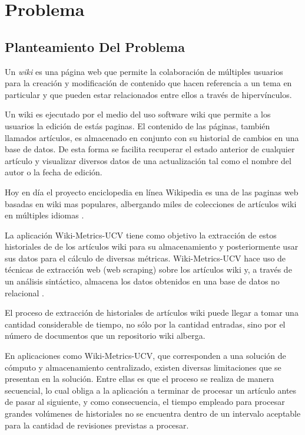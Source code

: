 \section{Problema}

\subsection{Planteamiento Del Problema}

Un \emph{wiki} es una página web que permite la colaboración de múltiples usuarios para 
la creación y modificación de contenido que hacen referencia a un tema en particular y
que pueden estar relacionados entre ellos a través de hipervínculos.

Un wiki es ejecutado por el medio del uso software wiki que permite a los usuarios la edición
de estás paginas. El contenido de las páginas, también llamados artículos, es almacenado en conjunto
con su historial de cambios en una base de datos. De esta forma se facilita recuperar el estado
anterior de cualquier artículo y visualizar diversos datos de una actualización tal como el
nombre del autor o la fecha de edición.

Hoy en día el proyecto enciclopedia en línea Wikipedia es una de las paginas web basadas en wiki
mas populares, albergando miles de colecciones de artículos wiki en múltiples idiomas \cite{3}.

La aplicación Wiki-Metrics-UCV tiene como objetivo la extracción de estos historiales de
de los artículos wiki para su almacenamiento y posteriormente usar sus datos para 
el cálculo de diversas métricas. Wiki-Metrics-UCV hace uso de técnicas de extracción web (web
scraping) sobre los artículos wiki y, a través de un análisis sintáctico, almacena los datos
obtenidos en una base de datos no relacional \cite{4}.

El proceso de extracción de historiales de artículos wiki puede llegar a tomar
una cantidad considerable de tiempo, no sólo por la cantidad entradas,
sino por el número de documentos que un repositorio wiki alberga. 

En aplicaciones como Wiki-Metrics-UCV, que corresponden a una solución de cómputo y almacenamiento
centralizado, existen diversas limitaciones que se presentan en la solución. Entre ellas es
que el proceso se realiza de manera secuencial, lo cual obliga a la aplicación a terminar
de procesar un artículo antes de pasar al siguiente, y como consecuencia, el tiempo
empleado para procesar grandes volúmenes de historiales no se encuentra dentro de un
intervalo aceptable para la cantidad de revisiones previstas a procesar.


